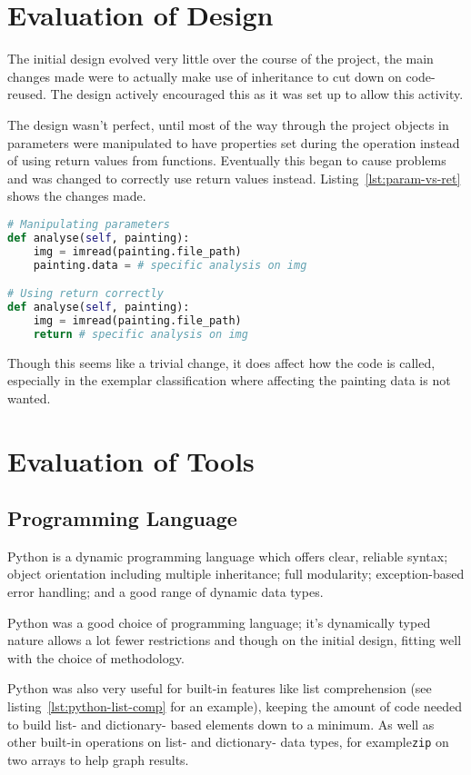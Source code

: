 \section{Evaluation of Design}
The initial design evolved very little over the course of the project, the main changes made were
to actually make use of inheritance to cut down on code-reused. The design actively encouraged
this as it was set up to allow this activity.

The design wasn't perfect, until most of the way through the project objects in parameters were 
manipulated to have properties set during the operation instead of using return values from 
functions. Eventually this began to cause problems and was changed to correctly use return values
instead. Listing~\ref{lst:param-vs-ret} shows the changes made.

\begin{lstlisting}[caption={Using return values instead of manipulating parameters},
label=lst:param-vs-ret,
breaklines=true,
language=python,
frame=single]
# Manipulating parameters
def analyse(self, painting):
    img = imread(painting.file_path)
    painting.data = # specific analysis on img

# Using return correctly
def analyse(self, painting):
    img = imread(painting.file_path)
    return # specific analysis on img
\end{lstlisting}

Though this seems like a trivial change, it does affect how the code is called, especially in the
exemplar classification where affecting the painting data is not wanted.


\section{Evaluation of Tools}

\subsection{Programming Language}
Python is a dynamic programming language which offers clear, reliable syntax; object orientation
including multiple inheritance; full modularity; exception-based error handling; and a good range
of dynamic data types.

Python was a good choice of programming language; it's dynamically typed nature allows a lot fewer
restrictions and though on the initial design, fitting well with the choice of methodology. 

Python was also very useful for built-in features like list comprehension (see 
listing~\ref{lst:python-list-comp} for an example), keeping the amount of code needed to build 
list- and dictionary- based elements down to a minimum. As well as other built-in operations on 
list- and dictionary- data types, for example\texttt{zip} on two arrays to help graph results.

